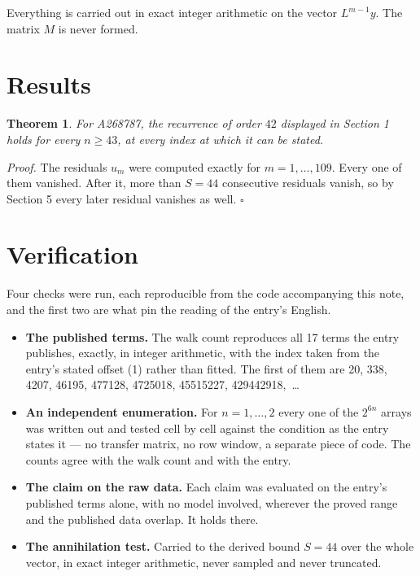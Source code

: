 \documentclass[11pt]{article}
\newtheorem{theorem}{Theorem}
\theoremstyle{definition}
\begin{document}
Everything is carried out in exact integer arithmetic on the vector $L^{m-1}y$. The matrix $M$ is never formed.

\section{Results}

\begin{theorem} For A268787, the recurrence of order $42$ displayed in Section 1 holds for every $n \ge 43$, at every index at which it can be stated.\end{theorem}

{\itshape Proof.} The residuals $u_m$ were computed exactly for $m = 1,\dots,109$. Every one of them vanished. After it, more than $S = 44$ consecutive residuals vanish, so by Section 5 every later residual vanishes as well. $\square$

\section{Verification}

Four checks were run, each reproducible from the code accompanying this note, and the first two are what pin the reading of the entry's English.

\begin{itemize}

\item {\bfseries The published terms.} The walk count reproduces all 17 terms the entry publishes, exactly, in integer arithmetic, with the index taken from the entry's stated offset (1) rather than fitted. The first of them are 20, 338, 4207, 46195, 477128, 4725018, 45515227, 429442918,~\dots

\item {\bfseries An independent enumeration.} For $n = 1,\dots,2$ every one of the $2^{6n}$ arrays was written out and tested cell by cell against the condition as the entry states it --- no transfer matrix, no row window, a separate piece of code. The counts agree with the walk count and with the entry.

\item {\bfseries The claim on the raw data.} Each claim was evaluated on the entry's published terms alone, with no model involved, wherever the proved range and the published data overlap. It holds there.

\item {\bfseries The annihilation test.} Carried to the derived bound $S = 44$ over the whole vector, in exact integer arithmetic, never sampled and never truncated.

\end{itemize}
\end{document}
